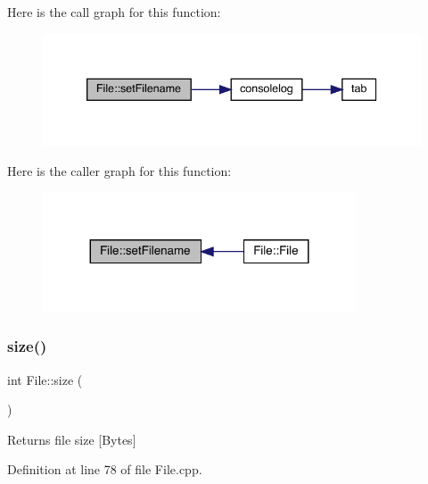 Here is the call graph for this function\+:
\nopagebreak
\begin{figure}[H]
\begin{center}
\leavevmode
\includegraphics[width=339pt]{class_file_a4fc5c5228613d30b136e5e9a0a046339_cgraph}
\end{center}
\end{figure}
Here is the caller graph for this function\+:
\nopagebreak
\begin{figure}[H]
\begin{center}
\leavevmode
\includegraphics[width=263pt]{class_file_a4fc5c5228613d30b136e5e9a0a046339_icgraph}
\end{center}
\end{figure}
\mbox{\label{class_file_afcaf98328e440ccaedb20e310dc6b6c4}} 
\subsubsection{\texorpdfstring{size()}{size()}}
{\footnotesize\ttfamily int File\+::size (\begin{DoxyParamCaption}{ }\end{DoxyParamCaption})}

\begin{DoxyReturn}{Returns}
file size \mbox{[}Bytes\mbox{]} 
\end{DoxyReturn}


Definition at line 78 of file File.\+cpp.

